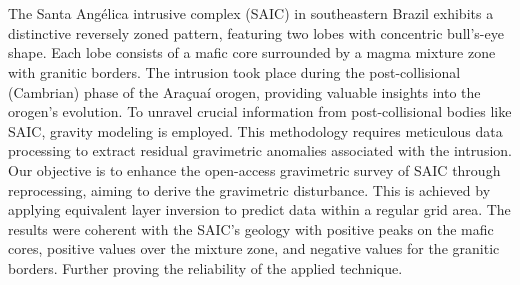 \singlespacing
{}
\section*{}

The Santa Angélica intrusive complex (SAIC) in southeastern Brazil exhibits a distinctive reversely zoned pattern, featuring two lobes with concentric bull's-eye shape. Each lobe consists of a mafic core surrounded by a magma mixture zone with granitic borders. The intrusion took place during the post-collisional (Cambrian) phase of the Araçuaí orogen, providing valuable insights into the orogen's evolution. To unravel crucial information from post-collisional bodies like SAIC, gravity modeling is employed. This methodology requires meticulous data processing to extract residual gravimetric anomalies associated with the intrusion. Our objective is to enhance the open-access gravimetric survey of SAIC through reprocessing, aiming to derive the gravimetric disturbance. This is achieved by applying equivalent layer inversion to predict data within a regular grid area. The results were coherent with the SAIC's geology with positive peaks on the mafic cores, positive values over the mixture zone, and negative values for the granitic borders. Further proving the reliability of the applied technique.
            
            


